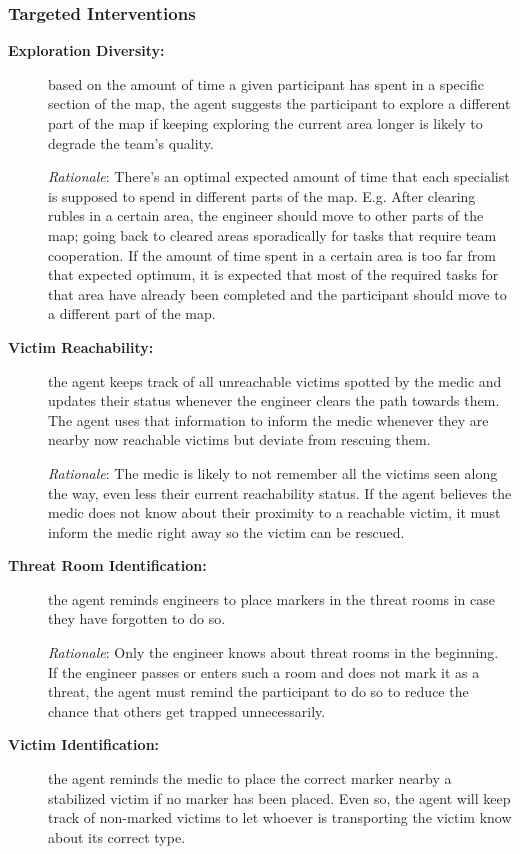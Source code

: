 \subsubsection{Targeted Interventions}

\begin{description}
    \item[\textbf{Exploration Diversity:}] based on the amount of time a given participant has spent in a specific section of the map, the agent suggests the participant to explore a different part of the map if keeping exploring the current area longer is likely to degrade the team’s quality.
        
    \emph{Rationale}: There’s an optimal expected amount of time that each specialist is supposed to spend in different parts of the map. E.g. After clearing rubles in a certain area, the engineer should move to other parts of the map; going back to cleared areas sporadically for tasks that require team cooperation. If the amount of time spent in a certain area is too far from that expected optimum, it is expected that most of the required tasks for that area have already been completed and the participant should move to a different part of the map.
    
    \item[\textbf{Victim Reachability:}] the agent keeps track of all unreachable victims spotted by the medic and updates their status whenever the engineer clears the path towards them. The agent uses that information to inform the medic whenever they are nearby now reachable victims but deviate from rescuing them.
        
    \emph{Rationale}: The medic is likely to not remember all the victims seen along the way, even less their current reachability status. If the agent believes the medic does not know about their proximity to a reachable victim, it must inform the medic right away so the victim can be rescued.
    
    \item[\textbf{Threat Room Identification:}] the agent reminds engineers to place markers in the threat rooms in case they have forgotten to do so.
        
    \emph{Rationale}: Only the engineer knows about threat rooms in the beginning. If the engineer passes or enters such a room and does not mark it as a threat, the agent must remind the participant to do so to reduce the chance that others get trapped unnecessarily.

	\item[\textbf{Victim Identification:}] the agent reminds the medic to place the correct marker nearby a stabilized victim if no marker has been placed. Even so, the agent will keep track of non-marked victims to let whoever is transporting the victim know about its correct type.
        

\end{description}
